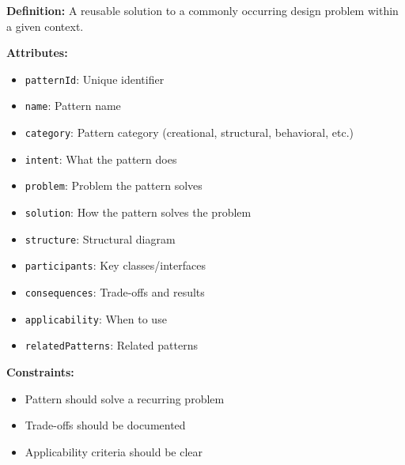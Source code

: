 \documentclass[11pt,letterpaper]{article}
\begin{document}
\begin{definitionbox}
\textbf{Definition:} A reusable solution to a commonly occurring design problem within a given context.

\textbf{Attributes:}
\begin{itemize}[nosep]
    \item \texttt{patternId}: Unique identifier
    \item \texttt{name}: Pattern name
    \item \texttt{category}: Pattern category (creational, structural, behavioral, etc.)
    \item \texttt{intent}: What the pattern does
    \item \texttt{problem}: Problem the pattern solves
    \item \texttt{solution}: How the pattern solves the problem
    \item \texttt{structure}: Structural diagram
    \item \texttt{participants}: Key classes/interfaces
    \item \texttt{consequences}: Trade-offs and results
    \item \texttt{applicability}: When to use
    \item \texttt{relatedPatterns}: Related patterns
\end{itemize}

\textbf{Constraints:}
\begin{itemize}[nosep]
    \item Pattern should solve a recurring problem
    \item Trade-offs should be documented
    \item Applicability criteria should be clear
\end{itemize}
\end{definitionbox}
\end{document}
